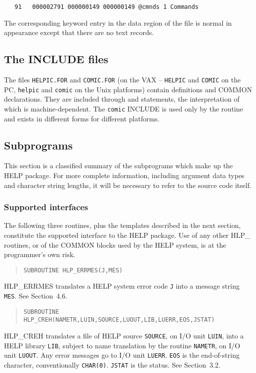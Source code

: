 \begin{verbatim}
   91   000002791 000000149 000000149 @cmnds 1 Commands
\end{verbatim}

The corresponding keyword entry in the data region of the file is
normal in appearance except that there are no text records.

\subsection{The INCLUDE files}
The files \verb|HELPIC.FOR| and \verb|COMIC.FOR| (on the VAX --
\verb|HELPIC| and \verb|COMIC| on the PC, \verb|helpic| and \verb|comic|
on the Unix platforms) contain definitions and
COMMON declarations.  They are included through 
and  statements, the
interpretation of which is machine-dependent.
The \verb|comic| INCLUDE is used only by the 
routine and exists in different forms for different platforms.

\subsection{Subprograms}
This section is a classified summary of the subprograms
which make up the HELP package.  For more complete information,
including argument data types and character string lengths, it will
be necessary to refer to the source code itself.

\subsubsection{Supported interfaces}
The following three routines, plus the templates described in the
next section, constitute the supported interface
to the HELP package.  Use of any other HLP\_ routines, or of the
COMMON blocks used by the HELP system, is at the
programmer's own risk.
\begin{verse}
\verb|SUBROUTINE HLP_ERRMES(J,MES)|
\end{verse}
HLP\_ERRMES translates a HELP system error code \verb|J|
into a message string \verb|MES|.  See Section~4.6.

\begin{verse}
\verb|SUBROUTINE HLP_CREH(NAMETR,LUIN,SOURCE,LUOUT,LIB,LUERR,EOS,JSTAT)|
\end{verse}
HLP\_CREH translates a file of HELP source \verb|SOURCE|,
on I/O unit \verb|LUIN|, into a HELP library \verb|LIB|, subject
to name translation by the routine \verb|NAMETR|, on I/O
unit \verb|LUOUT|.  Any error messages go to I/O unit \verb|LUERR|.
\verb|EOS| is the end-of-string character, conventionally \verb|CHAR(0)|.
\verb|JSTAT| is the status.  See Section~3.2.

